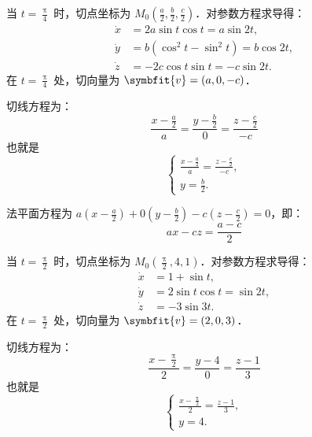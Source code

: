 \begin{solution}
    当 $t = \frac{\uppi}{4}$ 时，切点坐标为 $M_0 \left( \frac{a}{2}, \frac{b}{2}, \frac{c}{2} \right)$．对参数方程求导得：
    \begin{equation}
        \begin{aligned}
            \dot{x} & = 2a \sin t \cos t = a \sin 2t,       \\
            \dot{y} & = b(\cos^2 t - \sin^2 t) = b \cos 2t, \\
            \dot{z} & = -2c \cos t \sin t = -c \sin 2t.
        \end{aligned}
    \end{equation}
    在 $t = \frac{\uppi}{4}$ 处，切向量为 $\symbfit{v} = (a, 0, -c)$．

    切线方程为：
    \begin{equation}
        \boxed{\frac{x - \frac{a}{2}}{a} = \frac{y - \frac{b}{2}}{0} = \frac{z - \frac{c}{2}}{-c}}
    \end{equation}
    也就是
    \begin{equation}
        \boxed{
            \begin{cases}
                \frac{x - \frac{a}{2}}{a} = \frac{z - \frac{c}{2}}{-c},
                \\ y = \frac{b}{2}.
            \end{cases}
        }
    \end{equation}

    法平面方程为 $a\left(x - \frac{a}{2}\right) + 0\left(y - \frac{b}{2}\right) - c\left(z - \frac{c}{2}\right) = 0$，即：
    \begin{equation}
        \boxed{ax - cz = \frac{a - c}{2}}
    \end{equation}

    当 $t = \frac{\uppi}{2}$ 时，切点坐标为 $M_0 \left( \frac{\uppi}{2}, 4, 1 \right)$．对参数方程求导得：
    \begin{equation}
        \begin{aligned}
            \dot{x} & = 1 + \sin t,                \\
            \dot{y} & = 2 \sin t \cos t = \sin 2t, \\
            \dot{z} & = -3 \sin 3t.
        \end{aligned}
    \end{equation}
    在 $t = \frac{\uppi}{2}$ 处，切向量为 $\symbfit{v} = (2, 0, 3)$．

    切线方程为：
    \begin{equation}
        \boxed{\frac{x - \frac{\uppi}{2}}{2} = \frac{y - 4}{0} = \frac{z - 1}{3}}
    \end{equation}
    也就是
    \begin{equation}
        \boxed{
            \begin{cases}
                \frac{x - \frac{\uppi}{2}}{2} = \frac{z - 1}{3},
                \\ y = 4.
            \end{cases}
        }
    \end{equation}


\end{solution}

